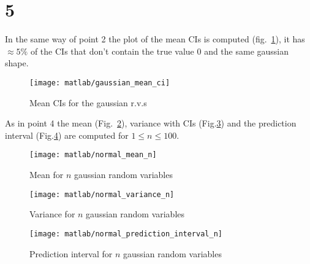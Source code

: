 \documentclass{article}
\begin{document}
\section*{5} In the same way of point 2 the plot of the mean CIs is computed
  (fig.~\ref{gaussian_mean_ci}), it has $\approx 5\%$ of the CIs that
  don't contain the true value 0 and the same gaussian shape.
  \begin{figure}[htbp]
    \centering
    \texttt{[image: matlab/gaussian\_mean\_ci]}
    \caption{Mean CIs for the gaussian r.v.s}
    \label{gaussian_mean_ci}
  \end{figure}

  As in point 4 the mean (Fig.~\ref{gaussian_mean_n}), variance with
  CIs (Fig.\ref{gaussian_var_n}) and the prediction interval
  (Fig.\ref{gaussian_pred_int_n}) are computed for $1 \leq n \leq 100$.
  \begin{figure}[htbp]
    \centering
    \texttt{[image: matlab/normal\_mean\_n]}
    \caption{Mean for $n$ gaussian random variables}
    \label{gaussian_mean_n}
  \end{figure}
  \begin{figure}[htbp]
    \centering
    \texttt{[image: matlab/normal\_variance\_n]}
    \caption{Variance for $n$ gaussian random variables}
    \label{gaussian_var_n}
  \end{figure}
    \begin{figure}[htbp]
    \centering
    \texttt{[image: matlab/normal\_prediction\_interval\_n]}
    \caption{Prediction interval for $n$ gaussian random variables}
    \label{gaussian_pred_int_n}
  \end{figure}
\end{document}
